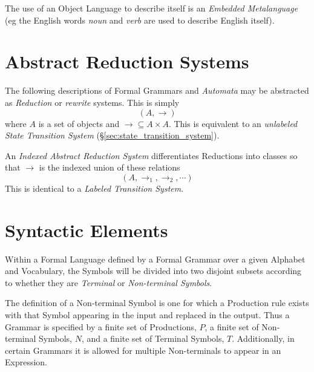 \documentclass{article}
\begin{document}
The use of an Object Language to describe itself is an \emph{Embedded
  Metalanguage} (eg the English words \emph{noun} and \emph{verb} are
used to describe English itself).

\section{Abstract Reduction Systems}\label{sec:abstract_rewrite}

The following descriptions of Formal Grammars and \emph{Automata} may
be abstracted as \emph{Reduction} or \emph{rewrite} systems. This is
simply
    \[(A,\rightarrow)\]
where $A$ is a set of objects and $\rightarrow \subseteq A \times
A$. This is equivalent to an \emph{unlabeled State Transition System}
(\S \ref{sec:state_transition_system}).

An \emph{Indexed Abstract Reduction System} differentiates Reductions
into classes so that $\rightarrow$ is the indexed union of these
relations
    \[(A, \rightarrow_1, \rightarrow_2, \cdots)\]
This is identical to a \emph{Labeled Transition System}.

\section{Syntactic Elements}

Within a Formal Language defined by a Formal Grammar over a given
Alphabet and Vocabulary, the Symbols will be divided into two disjoint
subsets according to whether they are \emph{Terminal} or
\emph{Non-terminal Symbols}.

The definition of a Non-terminal Symbol is one for which a Production
rule exists with that Symbol appearing in the input and replaced in
the output. Thus a Grammar is specified by a finite set of
Productions, $P$, a finite set of Non-terminal Symbols, $N$, and a
finite set of Terminal Symbols, $T$. Additionally, in certain Grammars
it is allowed for multiple Non-terminals to appear in an Expression.
\end{document}
